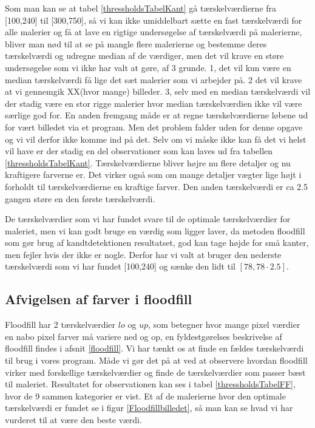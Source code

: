 Som man kan se at tabel \ref{thressholdsTabelKant} gå tærskelværdierne
fra [100,240] til [300,750], så vi kan ikke umiddelbart sætte en fast
tærskelværdi for alle malerier og få at lave en rigtige undersøgelse af
tærskelværdi på malerierne, bliver man nød til at se på mangle flere
malerierne og bestemme deres tærskelværdi og udregne median af de
værdiger, men det vil krave en støre undersøgelse som vi ikke har valt
at gøre, af 3 grunde. 1, det vil kun være en median tærskelværdi få lige
det sæt malerier som vi arbejder på. 2 det vil krave at vi gennemgik
XX(hvor mange) billeder. 3, selv med en median tærskelværdi vil der
stadig være en stor rigge malerier hvor median tærskelværdien ikke vil
være særlige god for. En anden fremgang måde er at regne
tærskelværdierne løbene ud for vært billedet via et program. Men det
problem falder uden for denne opgave og vi vil derfor ikke komme ind på
det. Selv om vi måske ikke kan få det vi helst vil have er der stadig en
del observationer som kan laves ud fra tabellen
\ref{thressholdsTabelKant}. Tærskelværdierne bliver højre nu flere
detaljer og nu kraftigere farverne er. Det virker også som om mange
detaljer vægter lige højt i forholdt til tærskelværdierne en kraftige
farver. Den anden tærskelværdi er ca 2.5 gangen støre en den første
tærskelværdi.

De tærskelværdier som vi har fundet svare til de optimale
tærskelværdier for maleriet, men vi kan godt bruge en værdig som ligger
laver, da metoden floodfill som gør brug af kandtdetektionen resultatset,
god kan tage højde for små kanter, men fejler hvis der ikke er nogle.
Derfor har vi valt at bruger den nederste tærskelværdi som vi har fundet
[100,240] og sænke den lidt til $[78,78 \cdot 2.5 ]$.

\subsection{Afvigelsen af farver i floodfill}
Floodfill har 2 tærskelværdier $lo$ og $up$, som betegner hvor mange pixel
værdier en nabo pixel farver må variere ned og op, en fyldestgørelses
beskrivelse af floodfill findes i afsnit \ref{floodfill}. Vi har tænkt os at
finde en fældes tærskelværdi til brug i vores program. Måde vi gør det på at
ved at observere hvordan floodfill virker med forskellige tærskelværdier og
finde de tærskelværdier som passer bæst til maleriet. Resultatet for
observationen kan ses i tabel \ref{thressholdsTabelFF}, hvor de 9 sammen
kategorier er vist. Et af de malerierne hvor den optimale tærskelværdi er
fundet se i figur \ref{Floodfillbilledet}, så man kan se hvad vi har vurderet
til at være den beste værdi.


